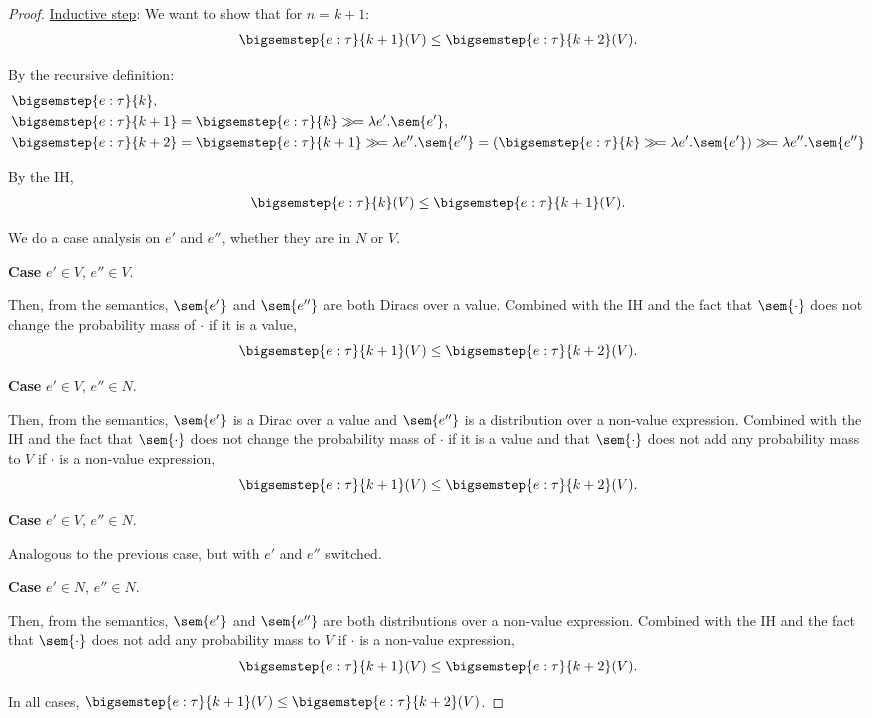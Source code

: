\begin{proof}
	\underline{Inductive step}:
	We want to show that for $n = k+1$:
	\begin{align*}
		\bigsemstep{e : \tau}{k+1}(V) \leq \bigsemstep{e : \tau}{k+2}(V).
	\end{align*}

	By the recursive definition:
	\begin{align*}
		&\bigsemstep{e : \tau}{k}, \\
		&\bigsemstep{e : \tau}{k+1} = \bigsemstep{e : \tau}{k} \gg\!= \lambda e'.\sem{e'}, \\
		&\bigsemstep{e : \tau}{k+2} = \bigsemstep{e : \tau}{k+1} \gg\!= \lambda e''.\sem{e''} = (\bigsemstep{e : \tau}{k} \gg\!= \lambda e'.\sem{e'}) \gg\!= \lambda e''.\sem{e''}
	\end{align*}

	By the IH,
	\begin{align*}
		\bigsemstep{e : \tau}{k}(V) \leq \bigsemstep{e : \tau}{k+1}(V).
	\end{align*}

	We do a case analysis on $e'$ and $e''$, whether they are in $N$ or $V$.

	\textbf{Case} $e' \in V$, $e'' \in V$.

	Then, from the semantics, $\sem{e'}$ and $\sem{e''}$ are both Diracs over a value. Combined with the IH and the fact that $\sem{\cdot}$ does not change the probability mass of $\cdot$ if it is a value, 
	\[
		\bigsemstep{e : \tau}{k+1}(V) \leq \bigsemstep{e : \tau}{k+2}(V).
	\]

	\textbf{Case} $e' \in V$, $e'' \in N$.
	
	Then, from the semantics, $\sem{e'}$ is a Dirac over a value and $\sem{e''}$ is a distribution over a non-value expression. Combined with the IH and the fact that $\sem{\cdot}$ does not change the probability mass of $\cdot$ if it is a value and that $\sem{\cdot}$ does not add any probability mass to $V$ if $\cdot$ is a non-value expression,
	\[
		\bigsemstep{e : \tau}{k+1}(V) \leq \bigsemstep{e : \tau}{k+2}(V).
	\]

	\textbf{Case} $e' \in V$, $e'' \in N$.

	Analogous to the previous case, but with $e'$ and $e''$ switched.

	\textbf{Case} $e' \in N$, $e'' \in N$.

	Then, from the semantics,  $\sem{e'}$ and $\sem{e''}$ are both distributions over a non-value expression. Combined with the IH and the fact that $\sem{\cdot}$ does not add any probability mass to $V$ if $\cdot$ is a non-value expression, 
	\[
		\bigsemstep{e : \tau}{k+1}(V) \leq \bigsemstep{e : \tau}{k+2}(V).
	\]

	In all cases, $\bigsemstep{e : \tau}{k+1}(V) \leq \bigsemstep{e : \tau}{k+2}(V)$.
\end{proof}

